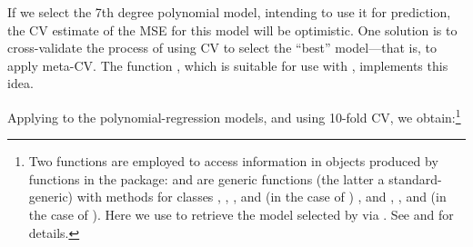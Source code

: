 \documentclass[
]{jss}
\begin{document}
If we select the 7th degree polynomial model, intending to use it for
prediction, the CV estimate of the MSE for this model will be
optimistic. One solution is to cross-validate the process of using CV to
select the ``best'' model---that is, to apply meta-CV. The function
, which is suitable for use with ,
implements this idea.

Applying  to the 
polynomial-regression models, and using 10-fold CV, we
obtain:\footnote{Two functions are employed to access information in
  objects produced by functions in the  package: 
  and  are generic functions (the latter a
  standard- generic) with methods for classes ,
  , , and  (in the
  case of ) , and , , and
   (in the case of ). Here we
  use  to retrieve the model
  selected by  via . See 
  and  for details.}
\end{document}
